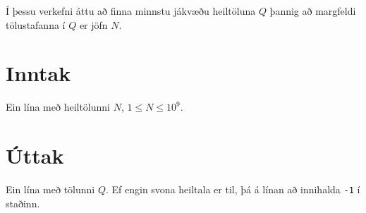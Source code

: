 

Í þessu verkefni áttu að finna minnstu jákvæðu heiltöluna $Q$ þannig að
margfeldi tölustafanna í $Q$ er jöfn $N$.

\section*{Inntak}
Ein lína með heiltölunni $N$, $1 \leq N \leq 10^9$.

\section*{Úttak}
Ein lína með tölunni $Q$. Ef engin svona heiltala er til, þá á línan að
innihalda \texttt{-1} í staðinn.

